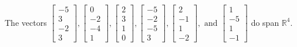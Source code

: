 \begin{exercise}
\begin{exerciseStatement}
  \end{exerciseStatement}
  \begin{exerciseAnswer}
   The vectors \(\left[\begin{array}{r}
-5 \\
3 \\
-2 \\
3
\end{array}\right] , \left[\begin{array}{r}
0 \\
-2 \\
-4 \\
1
\end{array}\right] , \left[\begin{array}{r}
2 \\
3 \\
1 \\
0
\end{array}\right] , \left[\begin{array}{r}
-5 \\
-2 \\
-5 \\
3
\end{array}\right] , \left[\begin{array}{r}
2 \\
-1 \\
1 \\
-2
\end{array}\right] , \text{ and } \left[\begin{array}{r}
1 \\
-5 \\
1 \\
-1
\end{array}\right]\) 
  	 do  
	span \(\mathbb{R}^4\).
  


  \end{exerciseAnswer}
\end{exercise}